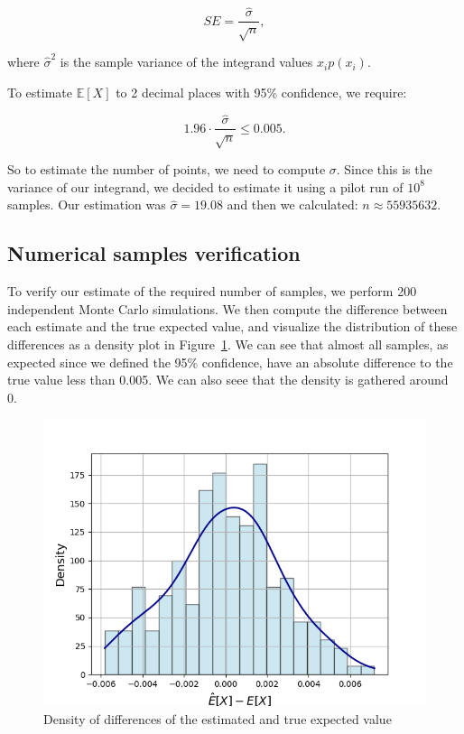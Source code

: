 \documentclass[9pt]{IEEEtran}
\begin{document}
\[
SE = \frac{\hat{\sigma}}{\sqrt{n}},
\]

where \( \hat{\sigma}^2 \) is the sample variance of the integrand values \( x_i p(x_i) \).

To estimate \( \mathbb{E}[X] \) to 2 decimal places with 95\% confidence, we require:

\[
1.96 \cdot \frac{\hat{\sigma}}{\sqrt{n}} \leq 0.005.
\]

So to estimate the number of points, we need to compute $\sigma$. Since this 
is the variance of our integrand, we decided to estimate it using a pilot run
 of $10^8$ samples. Our estimation was $\hat{\sigma} = 19.08$ and then we calculated: 
 $n \approx 55935632$. 



 \subsection{Numerical samples verification}
To verify our estimate of the required number of samples, we perform 
200 independent Monte Carlo simulations. We then compute the difference 
between each estimate and the true expected value, and visualize
 the distribution of these differences as a density plot in 
 Figure~\ref{fig:diff}. We can see that almost all samples, as expected since we defined the 
 95\% confidence, have an absolute 
 difference to the true value less than 0.005. We can also seee that the density is gathered 
 around 0. 

    \begin{figure}[h]
        \centering
        \includegraphics[width=0.99\columnwidth]{figures/diff.png}
        \caption{Density of differences of the estimated and true expected value}
        \label{fig:diff}
    \end{figure}
\end{document}
